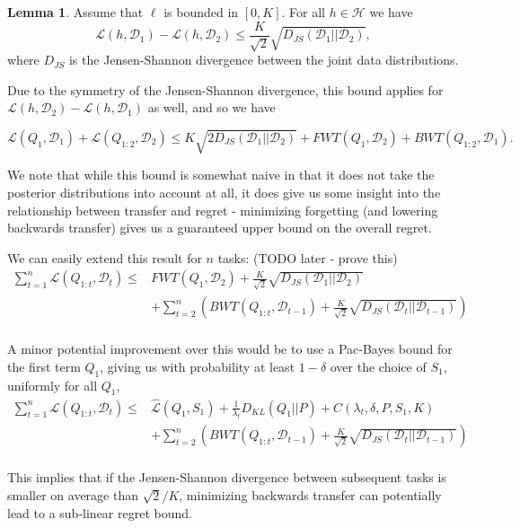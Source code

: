 \documentclass[letterpaper]{article}
\theoremstyle{definition}
\newtheorem{lemma}{Lemma}[section]
\begin{document}
\begin{lemma}
	Assume that $\ell$ is bounded in $[0, K]$. For all $h\in \mathcal{H}$ we have
	$$\mathcal{L}(h, \mathcal{D}_1)-\mathcal{L}(h, \mathcal{D}_2)\leq \frac{K}{\sqrt{2}}\sqrt{D_{JS}(\mathcal{D}_1||\mathcal{D}_2)},$$ 
	where $D_{JS}$ is the Jensen-Shannon divergence between the joint data distributions.
\end{lemma}

Due to the symmetry of the Jensen-Shannon divergence, this bound applies for $\mathcal{L}(h, \mathcal{D}_2)-\mathcal{L}(h, \mathcal{D}_1)$ as well, and so we have

\begin{equation}
\mathcal{L}(Q_1, \mathcal{D}_1)+\mathcal{L}(Q_{1:2}, \mathcal{D}_2) \leq 
K\sqrt{2 D_{JS}(\mathcal{D}_1||\mathcal{D}_2)}+FWT(Q_1, \mathcal{D}_2)+ BWT(Q_{1:2}, \mathcal{D}_1).
\end{equation}

We note that while this bound is somewhat naive in that it does not take the posterior distributions into account at all, it does give us some insight into the relationship between transfer and regret - minimizing forgetting (and lowering backwards transfer) gives us a guaranteed upper bound on the overall regret. 

We can easily extend this result for $n$ tasks: (TODO later - prove this) %
\begin{equation}
\begin{split}
 \sum_{t=1}^{n}\mathcal{L}(Q_{1:t}, \mathcal{D}_t) \leq &  FWT(Q_1, \mathcal{D}_2) + \frac{K}{\sqrt{2}}\sqrt{D_{JS}(\mathcal{D}_{1}||\mathcal{D}_{2})} \\ &+ \sum_{t=2}^{n}\left ( BWT(Q_{1:t}, \mathcal{D}_{t-1})+ \frac{K}{\sqrt{2}}\sqrt{D_{JS}(\mathcal{D}_{t}||\mathcal{D}_{t-1})}\right ) \\&
 \end{split}
\end{equation}

A minor potential improvement over this would be to use a Pac-Bayes bound for the first term $Q_1$, giving us with probability at least $1-\delta$ over the choice of $S_1$, uniformly for all $Q_1$,
\begin{equation}
\begin{split}
\sum_{t=1}^{n}\mathcal{L}(Q_{1:t}, \mathcal{D}_t) \leq &  \hat{\mathcal{L}}(Q_1, S_1)+\frac{1}{\lambda_t}D_{KL}(Q_1||P)+C(\lambda_t,\delta,P,S_1, K) \\ &+ \sum_{t=2}^{n}\left ( BWT(Q_{1:t}, \mathcal{D}_{t-1})+ \frac{K}{\sqrt{2}}\sqrt{D_{JS}(\mathcal{D}_{t}||\mathcal{D}_{t-1})}\right ) \\&
\end{split}
\end{equation}

This implies that if the Jensen-Shannon divergence between subsequent tasks is smaller on average than $\sqrt{2}/K$, minimizing backwards transfer can potentially lead to a sub-linear regret bound.

\clearpage


\end{document}
